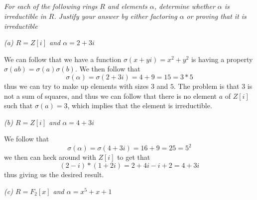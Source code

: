 \documentclass[11pt,oneside,titlepage]{book}
\begin{document}
\subsection{}

\textit{For each of the following rings $R$ and elements $\alpha$,
  determine whether $\alpha$ is irreductible in $R$. Justify
  your answer by either factoring $\alpha$ or proving that it is
  irreductible}

\textit{(a) $R = Z[i]$ and $\alpha = 2 + 3i$}

We can follow that we have a function $\sigma(x + yi) = x^2 + y^2$ is
having a property $\sigma(ab) = \sigma(a)\sigma(b)$. We then follow that
$$\sigma(\alpha) = \sigma(2 + 3i) = 4 + 9 = 15 = 3 * 5$$
thus we can try to make up elements with sizes $3$ and $5$. The problem is
that $3$ is not a sum of squares, and thus we can follow that there is
no element $a$ of $Z[i]$ such that $\sigma(a) = 3$, which implies that the
element is irreductible.

\textit{(b) $R = Z[i]$ and $\alpha = 4 + 3i$}

We follow that
$$\sigma(\alpha) = \sigma(4 + 3i) = 16 + 9 = 25 = 5^2$$
we then can heck around with $Z[i]$ to get that
$$(2 - i) * (1 + 2i) = 2 + 4i - i + 2 = 4 + 3i$$
thus giving us the desired result.

\textit{(c) $R = F_2[x]$ and $\alpha = x^5 + x + 1$}
\end{document}
